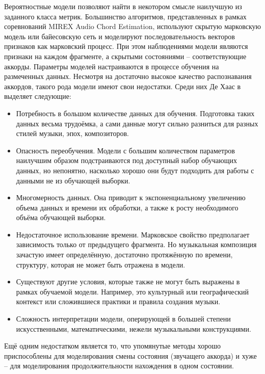 Вероятностные модели позволяют найти в некотором смысле наилучшую из заданного
класса метрик. Большинство алгоритмов, представленных в рамках соревнований
MIREX Audio Chord Estimation, используют скрытую марковскую модель или
байесовскую сеть и моделируют последовательность векторов признаков как
марковский процесс. При этом наблюдениями модели являются признаки на каждом
фрагменте, а скрытыми состояниями -- соответствующие аккорды. Параметры моделей
настраиваются в процессе обучения на размеченных данных. Несмотря на достаточно
высокое качество распознавания аккордов, такого рода модели имеют свои
недостатки. Среди них Де Хаас в \cite{DeHaas2012} выделяет следующие:
\begin{itemize}
  \item Потребность в большом количестве данных для обучения. Подготовка таких
  данных весьма трудоёмка, а сами данные могут сильно разниться для разных
  стилей музыки, эпох, композиторов.
  
  \item Опасность переобучения. Модели с большим количеством параметров
  наилучшим образом подстраиваются под доступный набор обучающих данных, но
  непонятно, насколько хорошо они будут подходить для работы с данными не из
  обучающей выборки.
  
  \item Многомерность данных. Она приводит к экспоненциальному увеличению объема
  данных и времени их обработки, а также к росту необходимого объёма обучающей
  выборки.
  
  \item Недостаточное использование времени. Марковское свойство предполагает
  зависимость только от предыдущего фрагмента. Но музыкальная композиция
  зачастую имеет определённую, достаточно протяжённую по времени, структуру,
  которая не может быть отражена в модели.
  
  \item Существуют другие условия, которые также не могут быть выражены в рамках
  обучаемой модели. Например, это культурный или географический контекст или
  сложившиеся практики и правила создания музыки.
  
  \item Сложность интерпретации модели, оперирующей в большей степени
  искусственными, математическими, нежели музыкальными конструкциями.
\end{itemize}

Ещё одним недостатком является то, что упомянутые методы хорошо приспособлены
для моделирования смены состояния (звучащего аккорда) и хуже -- для
моделирования продолжительности нахождения в одном состоянии.

